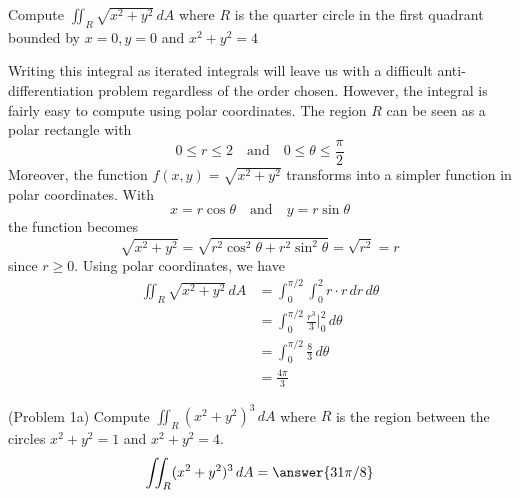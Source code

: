 \documentclass[handout]{ximera}
\begin{document}
\begin{example}[Example 1]
Compute $\iint_R \sqrt{x^2 + y^2} \, dA$ where $R$ is the quarter circle in the first quadrant bounded by $x=0, y=0$ and $x^2 + y^2 = 4$\\

\begin{image}
\end{image}
Writing this integral as iterated integrals will leave us with a difficult anti-differentiation problem regardless of the order chosen.
However, the integral is fairly easy to compute using polar coordinates. The region $R$ can be seen as a polar rectangle with 
\[
0\leq r \leq 2 \quad \text{and} \quad 0 \leq \theta \leq \frac{\pi}{2}
\]
Moreover, the function $f(x,y) = \sqrt{x^2 + y^2}$ transforms into a simpler function in polar coordinates. With
\[
x = r\cos \theta \quad \text{and} \quad y = r\sin \theta
\]
the function becomes
\[
\sqrt{x^2 +y^2} = \sqrt{r^2 \cos^2 \theta + r^2 \sin^2 \theta} = \sqrt{r^2} = r
\]
since $r \geq 0$.
Using polar coordinates, we have
\begin{align*}
\iint_R \sqrt{x^2 + y^2} \, dA & = \int_0^{\pi/2} \int_0^2 r \cdot r \, dr \, d\theta\\
                 & = \int_0^{\pi/2}  \frac{r^3}{3} \bigg|_{0}^2 \, d\theta\\
                 & = \int_0^{\pi/2} \frac83\, d\theta\\
                 &= \frac{4\pi}{3}
\end{align*}  

\end{example}

\begin{problem}(Problem 1a)
Compute $\iint_R (x^2 + y^2)^3 \, dA$ where $R$ is the region between the circles $x^2 + y^2 = 1$ and $x^2 + y^2 = 4$.\\
\[
\iint_R (x^2 + y^2)^3 \, dA = \answer{31\pi/8}
\]
\end{problem}
\end{document}
